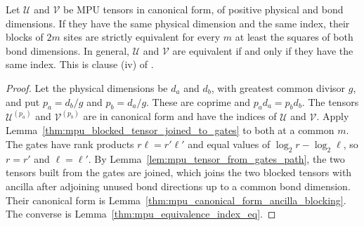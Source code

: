 \begin{lemma}
    \label{thm:mpu_equivalent_of_index_eq}
    \leanok
    Let $\mathcal U$ and $\mathcal V$ be MPU tensors in canonical form, of
    positive physical and bond dimensions. If they have the same physical
    dimension and the same index, their blocks of $2m$ sites are strictly
    equivalent for every $m$ at least the squares of both bond dimensions. In
    general, $\mathcal U$ and $\mathcal V$ are equivalent if and only if they
    have the same index. This is clause (iv) of
    \cite[Theorem~IV.6]{Cirac2017MPU}.
\end{lemma}

\begin{proof}\leanok
    Let the physical dimensions be $d_a$ and $d_b$, with greatest common divisor
    $g$, and put $p_a=d_b/g$ and $p_b=d_a/g$. These are coprime and
    $p_ad_a=p_bd_b$. The tensors $\mathcal U^{(p_a)}$ and $\mathcal V^{(p_b)}$
    are in canonical form and have the indices of $\mathcal U$ and
    $\mathcal V$. Apply Lemma~\ref{thm:mpu_blocked_tensor_joined_to_gates} to
    both at a common $m$. The gates have rank products $r\ell=r'\ell'$ and
    equal values of $\log_2r-\log_2\ell$, so $r=r'$ and $\ell=\ell'$. By
    Lemma~\ref{lem:mpu_tensor_from_gates_path}, the two tensors built from the
    gates are joined, which joins the two blocked tensors with ancilla after
    adjoining unused bond directions up to a common bond dimension. Their
    canonical form is Lemma~\ref{thm:mpu_canonical_form_ancilla_blocking}. The
    converse is Lemma~\ref{thm:mpu_equivalence_index_eq}.
\end{proof}


